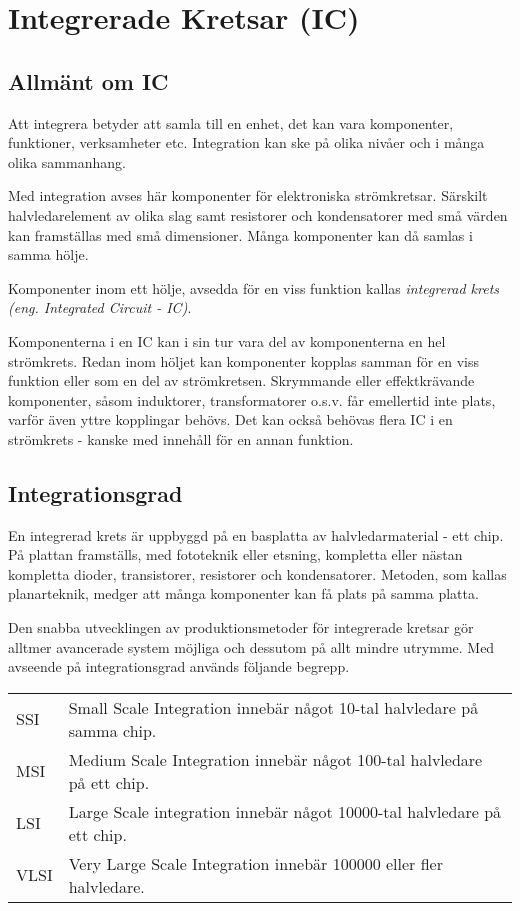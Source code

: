 \section{Integrerade Kretsar (IC)}

\subsection{Allmänt om IC}

Att integrera betyder att samla till en enhet, det kan vara komponenter,
funktioner, verksamheter etc. Integration kan ske på olika nivåer och i många
olika sammanhang.

Med integration avses här komponenter för elektroniska strömkretsar. Särskilt
halvledarelement av olika slag samt resistorer och kondensatorer med små värden
kan framställas med små dimensioner. Många komponenter kan då samlas i samma
hölje.

Komponenter inom ett hölje, avsedda för en viss funktion kallas
\emph{integrerad krets (eng. Integrated Circuit - IC)}.

Komponenterna i en IC kan i sin tur vara del av komponenterna en hel strömkrets.
Redan inom höljet kan komponenter kopplas samman för en viss funktion eller som
en del av strömkretsen. Skrymmande eller effektkrävande komponenter, såsom
induktorer, transformatorer o.s.v. får emellertid inte plats, varför även yttre
kopplingar behövs. Det kan också behövas flera IC i en strömkrets - kanske med
innehåll för en annan funktion.

\subsection{Integrationsgrad}

En integrerad krets är uppbyggd på en basplatta av halvledarmaterial - ett chip.
På plattan framställs, med fototeknik eller etsning, kompletta eller nästan
kompletta dioder, transistorer, resistorer och kondensatorer. Metoden, som
kallas planarteknik, medger att många komponenter kan få plats på samma platta.

Den snabba utvecklingen av produktionsmetoder för integrerade kretsar gör
alltmer avancerade system möjliga och dessutom på allt mindre utrymme. Med
avseende på integrationsgrad används följande begrepp.

\begin{tabular}{lp{6cm}}
SSI & Small Scale Integration innebär något 10-tal halvledare på samma chip. \\
MSI & Medium Scale Integration innebär något 100-tal halvledare på ett chip. \\
LSI & Large Scale integration innebär något 10000-tal halvledare på ett chip. \\
VLSI & Very Large Scale Integration innebär 100000 eller fler halvledare. \\
\end{tabular}

